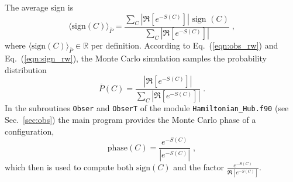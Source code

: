 The average sign is 
\begin{equation}\label{eqn:sign_rw}
	 \langle \text{sign} (C) \rangle_{\overline{P}} =    \frac { \sum_{C}  \left|  \Re \left[ e^{-S(C)} \right]   \right|   \text{ sign }(C) }  {  \sum_{C}   \left| \Re \left[ e^{-S(C)} \right] \right|  } \;,
\end{equation}
where  $\langle \text{sign} (C) \rangle_{\overline{P}} \in \mathbb{R}$ per definition.
According to Eq.~(\ref{eqn:obs_rw}) and Eq.~(\ref{eqn:sign_rw}), the Monte Carlo simulation samples the probability distribution 
\begin{equation}  
	 \overline{P}(C) = \frac{ \left|  \Re \left[ e^{-S(C)} \right] \right| }{\sum_C \left|  \Re \left[ e^{-S(C)} \right]  \right| }\;.
\end{equation}
In the subroutines  \texttt{Obser}  and \texttt{ObserT} of the module \texttt{Hamiltonian\_Hub.f90} (see Sec.~\ref{sec:obs})   the main program provides the  Monte Carlo phase of a configuration,
\begin{equation}\label{eqn:phase}
	\text{phase}(C)   =   \frac{e^{-S(C)}}{ \left| e^{-S(C) }\right| }\;,
\end{equation}
which then is used to compute both $ \text{sign}(C)$ and the factor $  \frac{e^{-S(C)}} {\Re \left[e^{-S(C)} \right]} $. 



 
